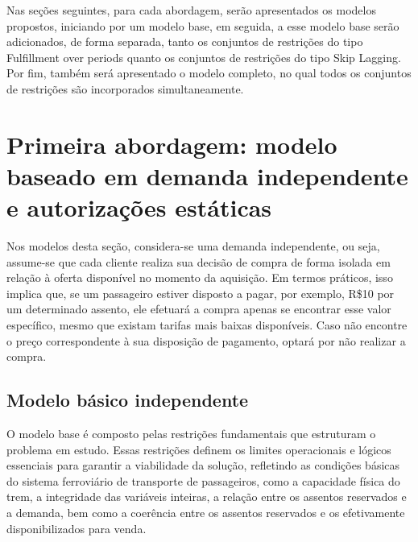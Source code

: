 

Nas seções seguintes, para cada abordagem, serão apresentados os modelos propostos, iniciando por um modelo base, em seguida, a esse modelo base serão adicionados, de forma separada, tanto os conjuntos de restrições do tipo Fulfillment over periods quanto os conjuntos de restrições do tipo Skip Lagging. Por fim, também será apresentado o modelo completo, no qual todos os conjuntos de restrições são incorporados simultaneamente.

\section{Primeira abordagem: modelo baseado em demanda independente e autorizações estáticas}

Nos modelos desta seção, considera-se uma demanda independente, ou seja, assume-se que cada cliente realiza sua decisão de compra de forma isolada em relação à oferta disponível no momento da aquisição. Em termos práticos, isso implica que, se um passageiro estiver disposto a pagar, por exemplo, R\$10 por um determinado assento, ele efetuará a compra apenas se encontrar esse valor específico, mesmo que existam tarifas mais baixas disponíveis. Caso não encontre o preço correspondente à sua disposição de pagamento, optará por não realizar a compra.

\subsection{Modelo básico independente}
O modelo base é composto pelas restrições fundamentais que estruturam o problema em estudo. Essas restrições definem os limites operacionais e lógicos essenciais para garantir a viabilidade da solução, refletindo as condições básicas do sistema ferroviário de transporte de passageiros, como a capacidade física do trem, a integridade das variáveis inteiras, a relação entre os assentos reservados e a demanda, bem como a coerência entre os assentos reservados e os efetivamente disponibilizados para venda.

